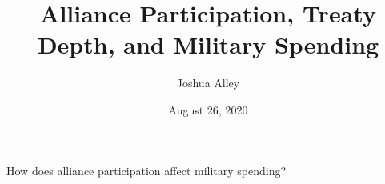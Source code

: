 \documentclass[12pt]{beamer}
\title{Alliance Participation, Treaty Depth, and Military Spending}
\date{August 26, 2020}
\author{Joshua Alley}
\institute{University of Virginia}
\begin{document}
 \maketitle



 \begin{frame}[standout]

How does alliance participation affect military spending?  

 \end{frame}
 

% 
%
%
%
%
%
%
% 
% 
%
%
 
 
\end{document}
